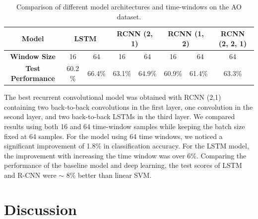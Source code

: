 \documentclass{article}
\begin{document}
\begin{table}[h]
\centering
\caption{Comparison of different model architectures and time-windows on the AO dataset.}
\label{table_1}
\begin{tabular}{ c c c c c c c c }
\hline
\textbf{Model}           & \multicolumn{2}{c}{\textbf{LSTM}} &
\multicolumn{2}{c}{\textbf{RCNN (2, 1)}} & \multicolumn{2}{c}{\textbf{RCNN (1, 2)}} & \textbf{RCNN (2, 2, 1)} \\ \hline
\textbf{Window Size}      & 16   & 64  & 16  & 64    &16    & \ 64    & 64           \\ \hline
\textbf{Test Performance} & 60.2 \%   & 66.4\%   & 63.1\% & 64.9\% & 60.9\%  & 61.4\%  & 63.3\%  \\  \hline
\end{tabular}
\end{table}


The best recurrent convolutional model was obtained with RCNN (2,1) containing two back-to-back convolutions in the first layer, one convolution in the second layer, and two back-to-back LSTMs in the third layer. We compared results using both 16 and 64 time-window samples while keeping the batch size fixed at 64 samples. For the model using 64 time windows, we noticed a significant improvement of 1.8\% in classification accuracy. For the LSTM model, the improvement with increasing the time window was over 6\%. Comparing the performance of the baseline model and deep learning, the test scores of LSTM and R-CNN were $\sim$ 8\% better than linear SVM.

\section{Discussion}
\end{document}

